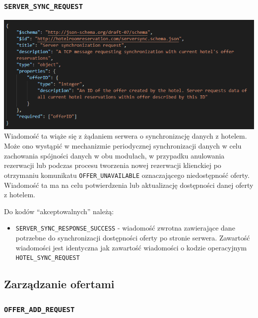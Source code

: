 \documentclass{article}
\begin{document}
\subsubsection{\texttt{SERVER\_SYNC\_REQUEST}}
\includegraphics[width=\linewidth]{Hotel login + synchronizacja/server_sync_request.png}
\indent Wiadomość ta wiąże się z żądaniem serwera o synchronizację danych z hotelem. Może ono wystąpić w mechanizmie periodycznej synchronizacji danych w celu zachowania spójności danych w obu modułach, w przypadku anulowania rezerwacji lub podczas procesu tworzenia nowej rezerwacji klienckiej po otrzymaniu komunikatu \texttt{OFFER\_UNAVAILABLE} oznaczającego niedostępność oferty. Wiadomość ta ma na celu potwierdzenia lub aktualizację dostępności danej oferty z hotelem. 

Do kodów “akceptowalnych” należą:
\begin{itemize}
    \item \texttt{SERVER\_SYNC\_RESPONSE\_SUCCESS} - wiadomość zwrotna zawierające dane potrzebne do synchronizacji dostępności oferty po stronie serwera. Zawartość wiadomości jest identyczna jak zawartość wiadomości o kodzie operacyjnym \texttt{HOTEL\_SYNC\_REQUEST}
\end{itemize}

\subsection{Zarządzanie ofertami}
\subsubsection{\texttt{OFFER\_ADD\_REQUEST}}
\end{document}
